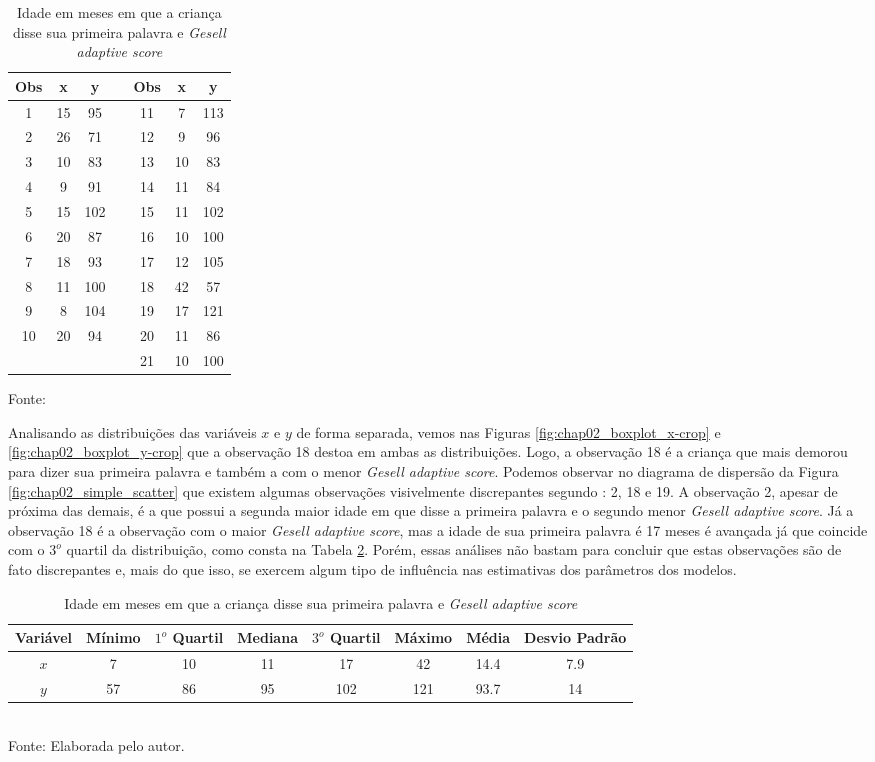 \begin{table}[h] 
\centering
\caption{Idade em meses em que a criança disse sua primeira palavra e  \textit{Gesell adaptive score}}
\label{tab:chap02_data}
\begin{tabular}{ccccccc}
\mbox{Obs} & x & y & & \mbox{Obs} & x & y \\
\hline
1  & 15 & 95  & & 11 & 7  & 113 \\
2  & 26 & 71  & & 12 & 9  & 96  \\
3  & 10 & 83  & & 13 & 10 & 83  \\
4  & 9  & 91  & & 14 & 11 & 84  \\
5  & 15 & 102 & & 15 & 11 & 102 \\
6  & 20 & 87  & & 16 & 10 & 100 \\
7  & 18 & 93  & & 17 & 12 & 105 \\
8  & 11 & 100 & & 18 & 42 & 57  \\
9  & 8  & 104 & & 19 & 17 & 121 \\
10 & 20 & 94  & & 20 & 11 & 86  \\
   &    &     & & 21 & 10 & 100 \\
\hline
\end{tabular}

Fonte:  \citet{WeissCho1998}
\end{table}

Analisando as distribuições das variáveis $x$ e $y$ de forma separada, vemos nas Figuras \ref{fig:chap02_boxplot_x-crop} e \ref{fig:chap02_boxplot_y-crop} que a observação 18 destoa em ambas as distribuições. Logo, a observação 18 é a criança que mais demorou para dizer sua primeira palavra e também a com o menor \textit{Gesell adaptive score}. Podemos observar no diagrama de dispersão da Figura \ref{fig:chap02_simple_scatter} que existem algumas observações visivelmente discrepantes segundo \citet{WeissCho1998}: 2, 18 e 19. A observação 2, apesar de próxima das demais, é a que possui a segunda maior idade em que disse a primeira palavra e o segundo menor \textit{Gesell adaptive score}. Já a observação 18 é a observação com o maior \textit{Gesell adaptive score}, mas a idade de sua primeira palavra é 17 meses é avançada já que coincide com o $3^o$ quartil da distribuição, como consta na Tabela \ref{tab:chap02_descrivas}. Porém, essas análises não bastam para concluir que estas observações são de fato discrepantes e, mais do que isso, se exercem algum tipo de influência nas estimativas dos parâmetros dos modelos.

\begin{table}[h] 
\centering
\caption{Idade em meses em que a criança disse sua primeira palavra e  \textit{Gesell adaptive score}}
\label{tab:chap02_descrivas}
\begin{tabular}{c|ccccc|cc}
\mbox{Variável} & Mínimo & $1^o$ Quartil & Mediana & $3^o$ Quartil & Máximo & Média & Desvio Padrão \\
\hline
$x$ &  7 & 10 & 11 &  17 &  42 &  14.4&  7.9 \\
$y$ & 57 & 86 & 95 & 102 & 121 & 93.7 & 14 \\
\hline
\end{tabular}
\\ Fonte: Elaborada pelo autor.
\end{table}


